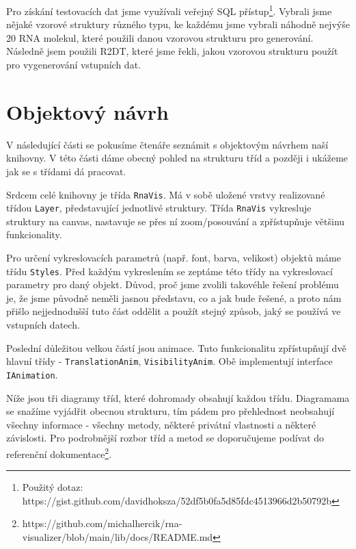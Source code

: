 Pro získání testovacích dat jsme využívali veřejný SQL přístup\footnote{Použitý
dotaz: https://gist.github.com/davidhoksza/52df5b0fa5d85fdc4513966d2b50792b}.
Vybrali jsme nějaké vzorové struktury různého typu, ke každému jsme vybrali
náhodně nejvýše $20$ RNA molekul, které použili danou vzorovou strukturu pro
generování. Následně jsem použili R2DT, které jsme řekli, jakou vzorovou
strukturu použít pro vygenerování vstupních dat.

\section{Objektový návrh}

V následující části se pokusíme čtenáře seznámit s objektovým návrhem naší
knihovny. V této části dáme obecný pohled na strukturu tříd a později i ukážeme
jak se s třídami dá pracovat.

Srdcem celé knihovny je třída \texttt{RnaVis}. Má v sobě uložené vrstvy
realizované třídou \texttt{Layer}, představující jednotlivé struktury. Třída
\texttt{RnaVis} vykresluje struktury na canvas, nastavuje se přes ní
zoom/posouvání a zpřístupňuje většinu funkcionality.

Pro určení vykreslovacích parametrů (např. font, barva, velikost) objektů  máme
třídu \texttt{Styles}. Před každým vykreslením se zeptáme této třídy na
vykreslovací parametry pro daný objekt. Důvod, proč jsme zvolili takovéhle
řešení problému je, že jsme původně neměli jasnou představu, co a jak bude
řešené, a proto nám přišlo nejjednodušší tuto část oddělit a použít stejný
způsob, jaký se používá ve vstupních datech.

Poslední důležitou velkou částí jsou animace. Tuto funkcionalitu zpřístupňují
dvě hlavní třídy - \texttt{TranslationAnim}, \texttt{VisibilityAnim}. Obě
implementují interface \texttt{IAnimation}. 

Níže jsou tři diagramy tříd, které dohromady obsahují každou třídu. Diagramama
se snažíme vyjádřit obecnou strukturu, tím pádem pro přehlednost neobsahují
všechny informace - všechny metody, některé privátní vlastnosti a některé
závislosti. Pro podrobnější rozbor tříd a metod se doporučujeme podívat do
referenční
dokumentace\footnote{https://github.com/michalhercik/rna-visualizer/blob/main/lib/docs/README.md}.
 
